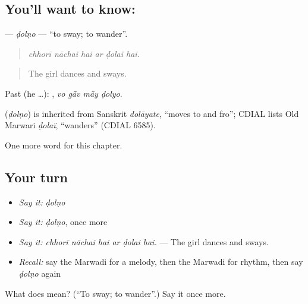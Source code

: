 \subsection*{You'll want to know: }
\textbf{} — \emph{ḍolṇo} — \textquotedblleft{}to sway; to wander\textquotedblright{}.

\begin{quote}
     
\end{quote}

\begin{quote}
\emph{chhorī nāchai hai ar ḍolai hai.}
\end{quote}

\begin{quote}
The girl dances and sways.
\end{quote}

Past (he …):    , \emph{vo gā̃v mā̃y ḍolyo}.

\begin{cousinweb}
\textbf{} (\emph{ḍolṇo}) is inherited from Sanskrit \emph{dolāyate}, \textquotedblleft{}moves to and fro\textquotedblright{}; CDIAL lists Old Marwari \emph{ḍolaï}, \textquotedblleft{}wanders\textquotedblright{} (CDIAL 6585).
\end{cousinweb}

\begin{grammarlens}[title={What you've built}]
One more word for this chapter.
\end{grammarlens}

\subsection*{Your turn}
\begin{itemize}
\raggedright
  \item \emph{Say it:} \emph{ḍolṇo}
  \item \emph{Say it:} \emph{ḍolṇo}, once more
  \item \emph{Say it:} \emph{chhorī nāchai hai ar ḍolai hai.} — The girl dances and sways.
  \item \emph{Recall:} say the Marwadi for a melody, then the Marwadi for rhythm, then say \emph{ḍolṇo} again
\end{itemize}

\begin{tcolorbox}[breakable,colback=teal!4,colframe=teal!35!black,title={Before you move on}]
What does  mean? (\textquotedblleft{}To sway; to wander\textquotedblright{}.) Say it once more.
\end{tcolorbox}
